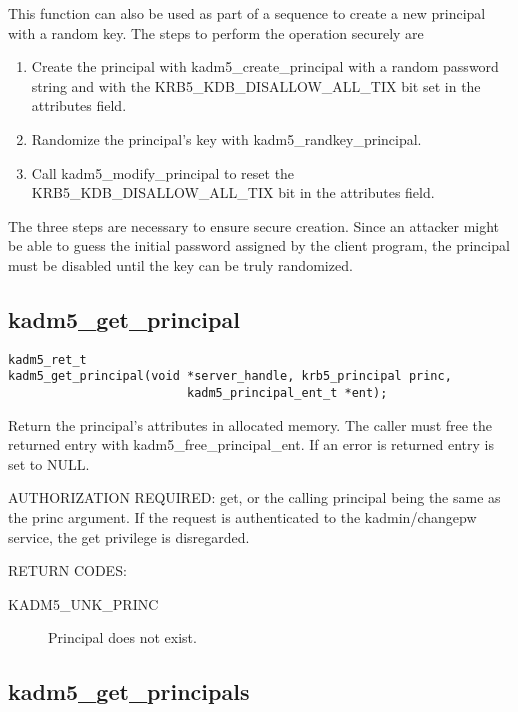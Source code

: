 This function can also be used as part of a sequence to create a new
principal with a random key.  The steps to perform the operation
securely are

\begin{enumerate}
\item Create the principal with kadm5_create_principal with a
random password string and with the KRB5_KDB_DISALLOW_ALL_TIX bit set
in the attributes field.

\item Randomize the principal's key with kadm5_randkey_principal.

\item Call kadm5_modify_principal to reset the
KRB5_KDB_DISALLOW_ALL_TIX bit in the attributes field.
\end{enumerate}

The three steps are necessary to ensure secure creation.  Since an
attacker might be able to guess the initial password assigned by the
client program, the principal must be disabled until the key can be
truly randomized.

\subsection{kadm5_get_principal}

\begin{verbatim}
kadm5_ret_t
kadm5_get_principal(void *server_handle, krb5_principal princ, 
                         kadm5_principal_ent_t *ent);  
\end{verbatim}

Return the principal's attributes in allocated memory.  The caller
must free the returned entry with kadm5_free_principal_ent.
If an error is returned entry is set to NULL.

AUTHORIZATION REQUIRED: get, or the calling principal being the same
as the princ argument.  If the request is authenticated to the
kadmin/changepw service, the get privilege is disregarded.


RETURN CODES:

\begin{description}
\item[KADM5_UNK_PRINC] Principal does not exist.
\end{description}

\subsection{kadm5_get_principals}

